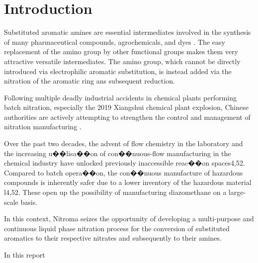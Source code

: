 \section{Introduction} %


Substituted aromatic amines are essential intermediates involved in the synthesis of many pharmaceutical compounds, agrochemicals, and dyes \cite{vogt_amines_2000}. The easy replacement of the amino group by other functional groups makes them very attractive versatile intermediates. The amino group, which cannot be directly introduced via electrophilic aromatic substitution, is instead added via the nitration of the aromatic ring ans subsequent reduction.

Following multiple deadly industrial accidents in chemical plants performing batch nitration, especially the 2019 Xiangshui chemical plant explosion, Chinese authorities are actively attempting to strengthen the control and management of nitration manufacturing \cite{el_diario_china_2019}.

Over the past two decades, the advent of flow chemistry in the laboratory and the increasing
u��lisa��on of con��nuous-flow manufacturing in the chemical industry have unlocked previously
inaccessible reac��on spaces4,52. Compared to batch opera��on, the con��nuous manufacture of
hazardous compounds is inherently safer due to a lower inventory of the hazardous material l4,52.
These open up the possibility of manufacturing diazomethane on a large-scale basis.


In this context, Nitroma seizes the opportunity of developing a multi-purpose and continuous liquid phase nitration process for the conversion of substituted aromatics to their respective nitrates and subsequently to their amines. 

In this report
%

